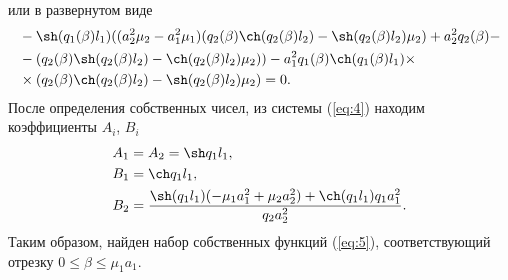 \documentclass[12pt, a4paper]{article}
\begin{document}
или в развернутом виде
\begin{equation}
  \begin{aligned}
  & -\sh(q_1(\beta) l_1) ((a_2^2 \mu_2-a_1^2 \mu_1) (q_2(\beta) \ch(q_2(\beta) l_2)-\sh(q_2(\beta) l_2) \mu_2)+a_2^2 q_2(\beta)- \\
  & -(q_2(\beta) \sh(q_2(\beta) l_2)-\ch(q_2(\beta) l_2) \mu_2))-a_1^2 q_1(\beta) \ch(q_1(\beta) l_1) \times \\
  & \times (q_2(\beta) \ch(q_2(\beta) l_2)-\sh(q_2(\beta) l_2) \mu_2) = 0.
  \end{aligned}
\end{equation}
После определения собственных чисел, из системы (\ref{eq:4}) находим коэффициенты $A_i$, $B_i$
\begin{equation}
  \begin{aligned}
    & A_1 = A_2 = \sh q_1l_1, \\
    & B_1 = \ch q_1l_1, \\
    & B_2 = \frac{\sh (q_1l_1) (-\mu_1 a_1^2 + \mu_2 a_2^2) + \ch (q_1l_1) q_1 a_1^2}{q_2a_2^2}.
  \end{aligned}
\end{equation}
Таким образом, найден набор собственных функций (\ref{eq:5}), соответствующий отрезку $ 0 \le \beta \le \mu_1a_1 $.
\end{document}
